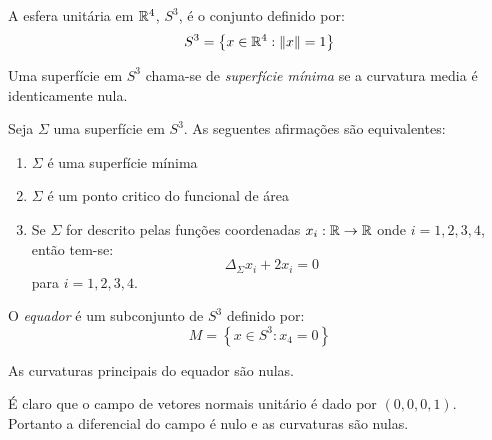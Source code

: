 \cite{Brendle2013}

\begin{definicao}
	A esfera unitária em $\mathbb{R}^4$, $S^3$, é o conjunto definido por:
	\begin{equation*}
	S^3 = \left\{ x \in \mathbb{R}^4: \| x \| = 1 \right\}
	\end{equation*}
\end{definicao}

\begin{definicao}
	Uma superfície em $S^3$ chama-se de \emph{superfície mínima} se a curvatura media é identicamente nula.
\end{definicao}

\begin{teorema}\label{propriedades_sup_min_S3}
	Seja $\Sigma$ uma superfície em $S^3$. As seguentes afirmações são equivalentes:
	\begin{enumerate}
		\item $\Sigma$ é uma superfície mínima
		\item $\Sigma$ é um ponto critico do funcional de área
		\item Se $\Sigma$ for descrito pelas funções coordenadas $x_i: \mathbb{R} \rightarrow \mathbb{R}$ onde $i=1,2,3,4$, então tem-se:
		\begin{equation*}
		\Delta_{\Sigma} x_i + 2 x_i = 0
		\end{equation*}
		para $i=1,2,3,4$.
	\end{enumerate}
\end{teorema}


\begin{definicao}
	O \emph{equador} é um subconjunto de $S^3$ definido por:
	\begin{equation}
	M = \left\{ x \in S^3: x_4 = 0 \right\}
	\end{equation}
\end{definicao}

\begin{proposicao}
	As curvaturas principais do equador são nulas.
\end{proposicao}

\begin{demonstracao}
	É claro que o campo de vetores normais unitário é dado por $(0,0,0,1)$. Portanto a diferencial do campo é nulo e as curvaturas são nulas.
\end{demonstracao}

